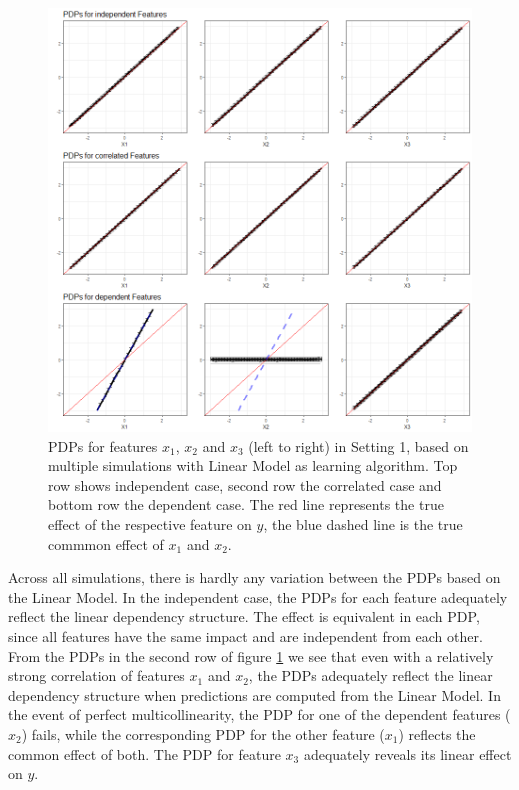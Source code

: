 \documentclass[]{krantz}
\begin{document}
\begin{figure}

\includegraphics[width=1\linewidth]{images/VK_PDP_14_Set1_LM} \hfill{}

\caption{PDPs for features $x_1$, $x_2$ and $x_3$ (left to right) in Setting 1, based on multiple simulations with Linear Model as learning algorithm. Top row shows independent case, second row the correlated case and bottom row the dependent case. The red line represents the true effect of the respective feature on $y$, the blue dashed line is the true commmon effect of $x_1$ and $x_2$.}\label{fig:Figure14}
\end{figure}

Across all simulations, there is hardly any variation between the PDPs
based on the Linear Model. In the independent case, the PDPs for each
feature adequately reflect the linear dependency structure. The effect
is equivalent in each PDP, since all features have the same impact and
are independent from each other. From the PDPs in the second row of
figure \ref{fig:Figure14} we see that even with a relatively strong
correlation of features \(x_1\) and \(x_2\), the PDPs adequately reflect
the linear dependency structure when predictions are computed from the
Linear Model. In the event of perfect multicollinearity, the PDP for one
of the dependent features (\(x_2\)) fails, while the corresponding PDP
for the other feature (\(x_1\)) reflects the common effect of both. The
PDP for feature \(x_3\) adequately reveals its linear effect on \(y\).
\end{document}
